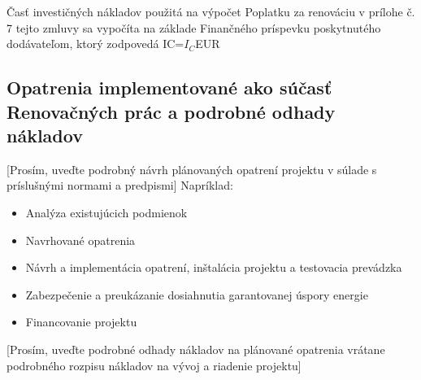Časť investičných nákladov použitá na výpočet Poplatku za renováciu v prílohe č. 7 tejto zmluvy sa vypočíta na základe Finančného príspevku poskytnutého dodávateľom, ktorý zodpovedá IC=$I_C$EUR

\subsection{Opatrenia implementované ako súčasť Renovačných prác a podrobné odhady nákladov}

[Prosím, uveďte podrobný návrh plánovaných opatrení projektu v súlade s príslušnými normami a predpismi] 
Napríklad:

\begin{itemize}
	\item Analýza existujúcich podmienok
	\item Navrhované opatrenia
	\item Návrh a implementácia opatrení, inštalácia projektu a testovacia prevádzka
	\item Zabezpečenie a preukázanie dosiahnutia garantovanej úspory energie
	\item Financovanie projektu
	
\end{itemize}

[Prosím, uveďte podrobné odhady nákladov na plánované opatrenia vrátane podrobného rozpisu nákladov na vývoj a riadenie projektu] 
